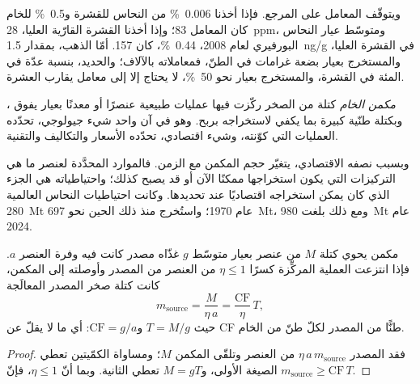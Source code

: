 ويتوقّف المعامل على المرجع. فإذا أخذنا \qty{0.006}{\percent} من النحاس للقشرة
و\qty{0.5}{\percent} للخام كان المعامل 83؛ وإذا أخذنا القشرة القارّية العليا،
\qty{28}{ppm}، ومتوسّط عيار النحاس البورفيري لعام 2008، \qty{0.44}{\percent}، كان 157. أمّا الذهب،
بمقدار \qty{1.5}{ng/g} في القشرة العليا، والمستخرج بعيار بضعة غرامات في الطنّ، فمعاملاته
بالآلاف؛ والحديد، بنسبة عدّة في المئة في القشرة، والمستخرج بعيار نحو \qty{50}{\percent}، لا يحتاج
إلا إلى معامل يقارب العشرة.

\begin{definition}\label{def:b2:ore-deposits:deposit}
\emph{مكمن الخام} كتلة من الصخر ركّزت فيها عمليات طبيعية
عنصرًا أو معدنًا بعيار يفوق ، وبكتلة طنّية كبيرة بما يكفي
لاستخراجه بربح. وهو في آن واحد شيء جيولوجي، تحدّده العمليات التي
كوّنته، وشيء اقتصادي، تحدّده الأسعار والتكاليف والتقنية.
\end{definition}

وبسبب نصفه الاقتصادي، يتغيّر حجم المكمن مع الزمن. فالموارد المحدَّدة
لعنصر ما هي التركيزات التي يكون استخراجها ممكنًا الآن أو قد يصبح كذلك؛ واحتياطياته
هي الجزء الذي كان يمكن استخراجه اقتصاديًا عند تحديدها. وكانت احتياطيات النحاس العالمية
\qty{280}{Mt} عام 1970؛ واستُخرج منذ ذلك الحين نحو \qty{697}{Mt}، ومع ذلك
بلغت \qty{980}{Mt} عام 2024.

\begin{proposition}\label{prop:b2:ore-deposits:mass-balance}
مكمن يحوي كتلة $M$ من عنصر بعيار متوسّط $g$ غذّاه مصدر كانت فيه وفرة
العنصر $a$. فإذا انتزعت العملية المركِّزة كسرًا $\eta \leq 1$ من
العنصر من المصدر وأوصلته إلى المكمن، كانت كتلة صخر المصدر المعالَجة
\begin{equation}
m_{\mathrm{source}} = \frac{M}{\eta\,a} = \frac{\mathrm{CF}}{\eta}\, T ,
\label{eq:b2:ore-deposits:mass-balance}
\end{equation}
حيث $T = M/g$  و$\mathrm{CF} = g/a$: أي ما لا يقلّ عن CF طنًّا من المصدر لكلّ طنّ من الخام.
\end{proposition}

\begin{proof}
فقد المصدر $\eta\,a\,m_{\mathrm{source}}$ من العنصر وتلقّى المكمن $M$؛ ومساواة
الكمّيتين تعطي الصيغة الأولى، و$M = gT$ تعطي الثانية. وبما أنّ $\eta \leq 1$، فإنّ $m_{\mathrm{source}} \geq
\mathrm{CF}\,T$.
\end{proof}


